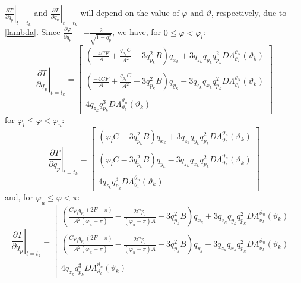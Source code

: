 \documentclass{article}
\begin{document}
		$\left .\displaystyle \frac{\partial T}{\partial q_p}\right |_{t=t_k}$ and $\left .\displaystyle \frac{\partial T}{\partial q_w}\right |_{t=t_k}$ will depend on the value of $\varphi$ and $\vartheta$, respectively, due to \eqref{lambda}. Since $\displaystyle \frac{\partial \varphi}{\partial q_p} = - \displaystyle \frac{2}{\sqrt{1-q_p^2}}$, we have, for $0 \leq \varphi < \varphi_l$:
		\[
			\left .\displaystyle \frac{\partial T}{\partial q_p}\right |_{t=t_k}  = \begin{bmatrix}
												\left (\displaystyle \frac{-4 C F}{A} + \displaystyle \frac{q_{p_k} C}{A^2}- 3 q_{p_k}^2 B \right )q_{x_k} + 3 q_{z_k} q_{y_k} q_{p_k}^2 D \Lambda_{\vartheta_l}^{\vartheta_u}(\vartheta_k)\\\\
												\left (\displaystyle \frac{-4 C F}{A} + \displaystyle \frac{q_{p_k} C}{A^2} - 3 q_{p_k}^2 B \right )q_{y_k} - 3 q_{z_k} q_{x_k} q_{p_k}^2 D \Lambda_{\vartheta_l}^{\vartheta_u}(\vartheta_k)\\\\
												4 q_{z_k} q_{p_k}^3 D \Lambda_{\vartheta_l}^{\vartheta_u}(\vartheta_k)
											   \end{bmatrix}
		\] 
		for $\varphi_l \leq \varphi < \varphi_u$:
		\[
			\left .\displaystyle \frac{\partial T}{\partial q_p}\right |_{t=t_k}  = \begin{bmatrix}
												\left ( \varphi_lC -3 q_{p_k}^2 B \right )q_{x_k} + 3 q_{z_k} q_{y_k} q_{p_k}^2 D \Lambda_{\vartheta_l}^{\vartheta_u}(\vartheta_k)\\\\
												\left ( \varphi_lC -3 q_{p_k}^2 B \right )q_{y_k} -3 q_{z_k} q_{x_k} q_{p_k}^2 D \Lambda_{\vartheta_l}^{\vartheta_u}(\vartheta_k)\\\\
												4 q_{z_k} q_{p_k}^3 D \Lambda_{\vartheta_l}^{\vartheta_u}(\vartheta_k)
											   \end{bmatrix}
		\] 
		and, for $\varphi_u \leq \varphi < \pi$:
		\[
			\left .\displaystyle \frac{\partial T}{\partial q_p}\right |_{t=t_k}  = \begin{bmatrix}
												\left (\displaystyle \frac{C \varphi_l q_{p_k} \left ( 2F -\pi \right)}{A^2 \left ( \varphi_u - \pi \right )}-\displaystyle \frac{2 C \varphi_l}{\left (\varphi_u-\pi \right)A} - 3 q_{p_k}^2 B \right )q_{x_k} + 3 q_{z_k} q_{y_k} q_{p_k}^2 D \Lambda_{\vartheta_l}^{\vartheta_u}(\vartheta_k)\\\\
												\left (\displaystyle \frac{C \varphi_l q_{p_k} \left ( 2F -\pi \right)}{A^2 \left ( \varphi_u - \pi \right )}-\displaystyle \frac{2 C \varphi_l}{\left (\varphi_u-\pi \right) A} - 3 q_{p_k}^2 B \right )q_{y_k} - 3 q_{z_k} q_{x_k} q_{p_k}^2 D \Lambda_{\vartheta_l}^{\vartheta_u}(\vartheta_k)\\\\
												4 q_{z_k} q_{p_k}^3 D \Lambda_{\vartheta_l}^{\vartheta_u}(\vartheta_k)
											   \end{bmatrix}
		\] 
		
\end{document}
